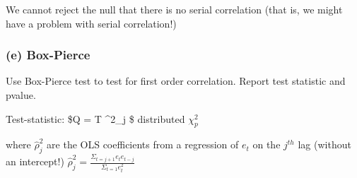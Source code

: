 \documentclass[11pt,]{article}
\begin{document}
We cannot reject the null that there is no serial correlation (that is,
we might have a problem with serial correlation!)

\subsubsection{(e) Box-Pierce}\label{e-box-pierce}

Use Box-Pierce test to test for first order correlation. Report test
statistic and pvalue.

Test-statistic: \$Q = T \Sigma\hat\rho\^{}2\_j \$ distributed
\(\chi^2_p\)

where \(\hat\rho^2_j\) are the OLS coefficients from a regression of
\(e_t\) on the \(j^{th}\) lag (without an intercept!)
\(\hat\rho^2_j = \frac {\Sigma_{t=j+1} e_t e_{t-j}}{\Sigma_{t=1} e^2_t}\)
\end{document}
